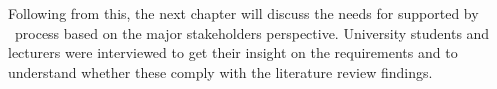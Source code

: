 Following from this, the next chapter will discuss the needs for \LLLs supported
by \ep~process based on the major stakeholders perspective. University students
and lecturers were interviewed to get their insight on the requirements and to
understand whether these comply with the literature review findings.

